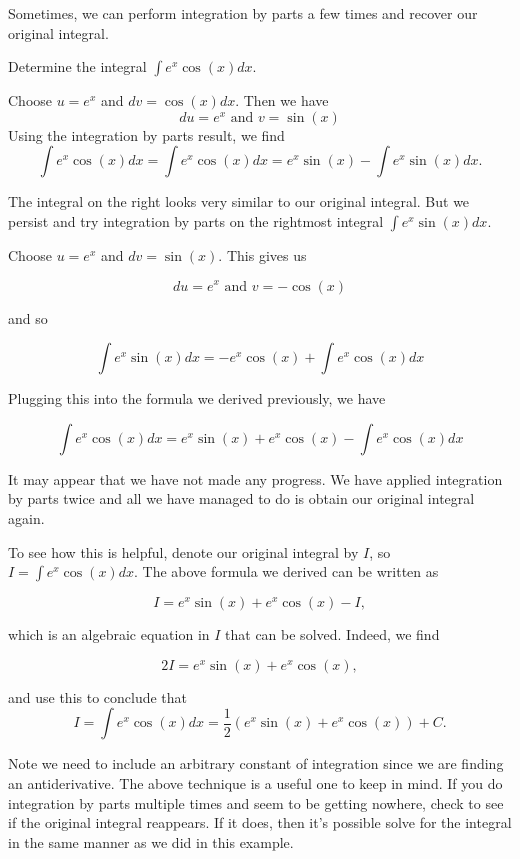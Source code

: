\documentclass[noauthor]{ximera}
\begin{document}
Sometimes, we can perform integration by parts a few times and recover our original integral.

\begin{example}
Determine the integral $\int e^{x}\cos(x) dx$.
\begin{explanation}

Choose $u=e^{x}$ and $dv=\cos(x) dx$. 
Then we have 
\[
du =e^{x} \text{ and }  v=\sin(x) 
\]
Using the integration by parts result, we find
\[
\int e^{x}\cos(x) dx = \int e^{x} \cos(x) dx= e^{x} \sin(x) - \int e^{x} \sin(x) dx.
\]

The integral on the right looks very similar to our original integral. But we persist and try integration by parts on the rightmost integral $\int e^{x} \sin(x) dx$. 

Choose $u=e^{x}$ and $dv= \sin(x)$. 
This gives us 

\[
du=e^{x} \text{ and } v=-\cos(x)
\]

and so 

\[
\int e^{x}\sin(x) dx= -e^{x}\cos(x) + \int e^{x} \cos(x) dx
\]

Plugging this into the formula we derived previously, we have

\[ 
\int e^{x} \cos(x) dx=e^{x} \sin(x)+e^{x} \cos(x) - \int e^{x} \cos(x) dx
\]

It may appear that we have not made any progress. We have applied integration by parts twice and all we have managed to do is obtain our original integral again.

To see how this is helpful, denote our original integral by $I$, so $I=\int e^{x} \cos(x) dx$. The above formula we derived can be written as 

\[
 I = e^{x} \sin(x) +e^{x} \cos(x) -I,
\] 

which is an algebraic equation in $I$ that can be solved. Indeed, we find

\[
 2I = e^{x} \sin(x) +e^{x} \cos(x),
\] 

and use this to conclude that
\[
 I=\int e^{x}\cos(x) dx= \frac{1}{2} ( e^{x} \sin(x) +e^{x} \cos(x) ) + C.
\]

Note we need to include an arbitrary constant of integration since we are finding an antiderivative. The above technique is a useful one to keep in mind. If you do integration by parts multiple times and seem to be getting nowhere, check to see if the original integral reappears.  If it does, then it's possible solve for the integral in the same manner as we did in this example. 
\end{explanation}
\end{example}
\end{document}
